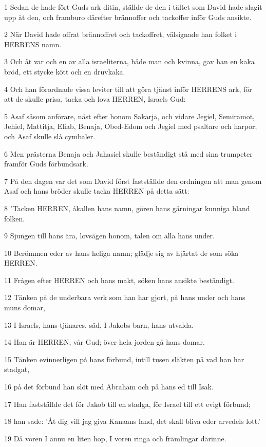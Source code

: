 \par 1 Sedan de hade fört Guds ark ditin, ställde de den i tältet som David hade slagit upp åt den, och framburo därefter brännoffer och tackoffer inför Guds ansikte.
\par 2 När David hade offrat brännoffret och tackoffret, välsignade han folket i HERRENS namn.
\par 3 Och åt var och en av alla israeliterna, både man och kvinna, gav han en kaka bröd, ett stycke kött och en druvkaka.
\par 4 Och han förordnade vissa leviter till att göra tjänst inför HERRENS ark, för att de skulle prisa, tacka och lova HERREN, Israels Gud:
\par 5 Asaf såsom anförare, näst efter honom Sakarja, och vidare Jegiel, Semiramot, Jehiel, Mattitja, Eliab, Benaja, Obed-Edom och Jegiel med psaltare och harpor; och Asaf skulle slå cymbaler.
\par 6 Men prästerna Benaja och Jahasiel skulle beständigt stå med sina trumpeter framför Guds förbundsark.
\par 7 På den dagen var det som David först fastställde den ordningen att man genom Asaf och hans bröder skulle tacka HERREN på detta sätt:
\par 8 "Tacken HERREN, åkallen hans namn, gören hans gärningar kunniga bland folken.
\par 9 Sjungen till hans ära, lovsägen honom, talen om alla hans under.
\par 10 Berömmen eder av hans heliga namn; glädje sig av hjärtat de som söka HERREN.
\par 11 Frågen efter HERREN och hans makt, söken hans ansikte beständigt.
\par 12 Tänken på de underbara verk som han har gjort, på hans under och hans muns domar,
\par 13 I Israels, hans tjänares, säd, I Jakobs barn, hans utvalda.
\par 14 Han är HERREN, vår Gud; över hela jorden gå hans domar.
\par 15 Tänken evinnerligen på hans förbund, intill tusen släkten på vad han har stadgat,
\par 16 på det förbund han slöt med Abraham och på hans ed till Isak.
\par 17 Han fastställde det för Jakob till en stadga, för Israel till ett evigt förbund;
\par 18 han sade: 'Åt dig vill jag giva Kanaans land, det skall bliva eder arvedels lott.'
\par 19 Då voren I ännu en liten hop, I voren ringa och främlingar därinne.
